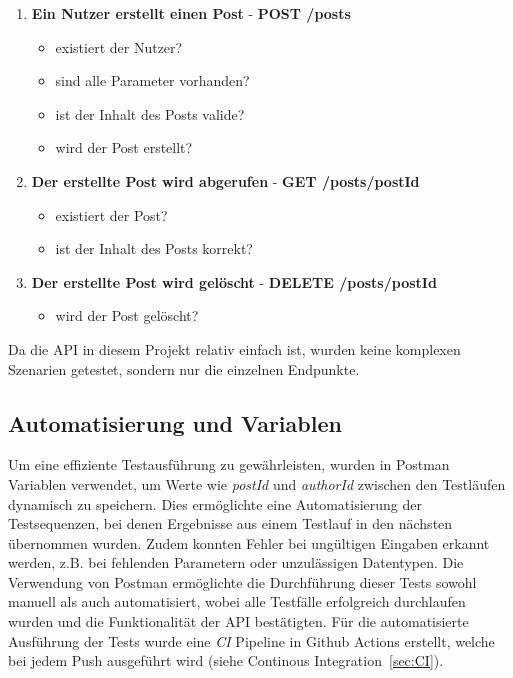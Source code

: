 \begin{enumerate}
    \item \textbf{Ein Nutzer erstellt einen Post} - \textbf{POST /posts}
        \begin{itemize}
            \item existiert der Nutzer?
            \item sind alle Parameter vorhanden?
            \item ist der Inhalt des Posts valide?
            \item wird der Post erstellt?
        \end{itemize}
    \item \textbf{Der erstellte Post wird abgerufen} - \textbf{GET /posts/{{postId}}}
        \begin{itemize}
            \item existiert der Post?
            \item ist der Inhalt des Posts korrekt?
        \end{itemize}
    \item \textbf{Der erstellte Post wird gelöscht} - \textbf{DELETE /posts/{{postId}}}
        \begin{itemize}
            \item wird der Post gelöscht?
        \end{itemize}
\end{enumerate}

Da die \ac{API} in diesem Projekt relativ einfach ist, wurden keine komplexen Szenarien getestet, sondern nur die einzelnen Endpunkte.

\subsection{Automatisierung und Variablen}

Um eine effiziente Testausführung zu gewährleisten, wurden in Postman Variablen verwendet, 
um Werte wie \textit{postId} und \textit{authorId} zwischen den Testläufen dynamisch zu speichern. 
Dies ermöglichte eine Automatisierung der Testsequenzen, bei denen Ergebnisse aus einem Testlauf in den nächsten übernommen wurden. 
Zudem konnten Fehler bei ungültigen Eingaben erkannt werden, z.B. bei fehlenden Parametern oder unzulässigen Datentypen.
Die Verwendung von Postman ermöglichte die Durchführung dieser Tests sowohl manuell als auch automatisiert,
wobei alle Testfälle erfolgreich durchlaufen wurden und die Funktionalität der \ac{API} bestätigten.
Für die automatisierte Ausführung der Tests wurde eine \textit{\ac{CI}} Pipeline in Github Actions erstellt, welche bei jedem Push ausgeführt wird (siehe Continous Integration~\ref{sec:CI}).
